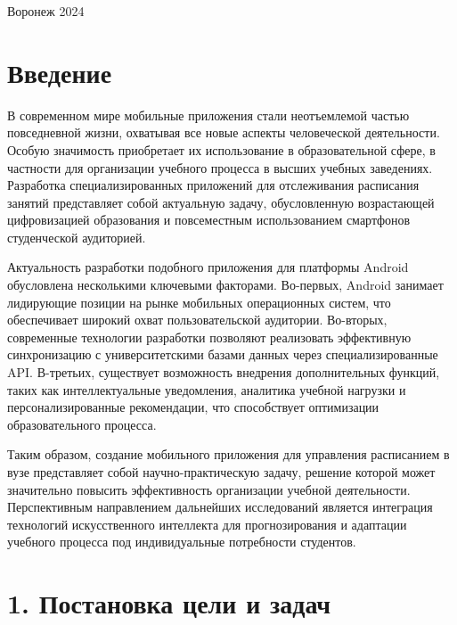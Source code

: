 \documentclass{vsureport}
\begin{document}
\begin{center} Воронеж 2024 \end{center} 

\thispagestyle{empty} %

\newpage
\thispagestyle{empty} %
\tableofcontents

\newpage

\section*{Введение}

В современном мире мобильные приложения стали неотъемлемой частью повседневной жизни, охватывая все новые аспекты человеческой деятельности. Особую значимость приобретает их использование в образовательной сфере, в частности для организации учебного процесса в высших учебных заведениях. Разработка специализированных приложений для отслеживания расписания занятий представляет собой актуальную задачу, обусловленную возрастающей цифровизацией образования и повсеместным использованием смартфонов студенческой аудиторией.

Актуальность разработки подобного приложения для платформы Android обусловлена несколькими ключевыми факторами. Во-первых, Android занимает лидирующие позиции на рынке мобильных операционных систем, что обеспечивает широкий охват пользовательской аудитории. Во-вторых, современные технологии разработки позволяют реализовать эффективную синхронизацию с университетскими базами данных через специализированные API. В-третьих, существует возможность внедрения дополнительных функций, таких как интеллектуальные уведомления, аналитика учебной нагрузки и персонализированные рекомендации, что способствует оптимизации образовательного процесса. \cite{ref1}

Таким образом, создание мобильного приложения для управления расписанием в вузе представляет собой научно-практическую задачу, решение которой может значительно повысить эффективность организации учебной деятельности. Перспективным направлением дальнейших исследований является интеграция технологий искусственного интеллекта для прогнозирования и адаптации учебного процесса под индивидуальные потребности студентов.


\newpage

\section*{1. Постановка цели и задач}
\end{document}
